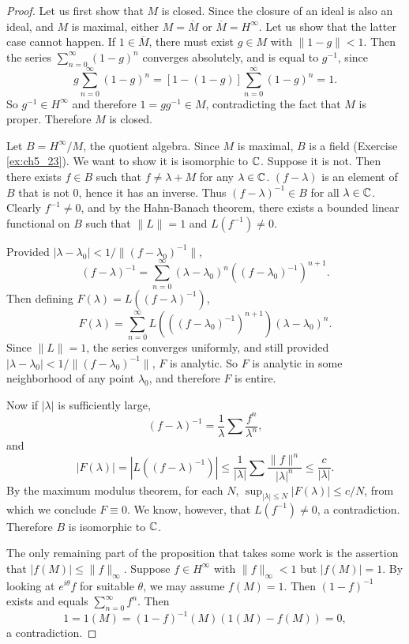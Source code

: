 \begin{proof}
Let us first show that $M$ is closed. Since the closure of an ideal is also an ideal, and $M$ is maximal, either $M = \overline{M}$ or $\overline{M} = H^\infty$. Let us show that the latter case cannot happen. If $1 \in \overline{M}$, there must exist $g \in M$ with $\|1 - g\| < 1$. Then the series $\sum_{n=0}^\infty(1-g)^n$ converges absolutely, and is equal to $g^{-1}$, since
\[
    g\sum_{n=0}^\infty(1-g)^n = [1-(1-g)]\sum_{n=0}^\infty(1-g)^n = 1.
\]
So $g^{-1} \in H^\infty$ and therefore $1 = gg^{-1} \in M$, contradicting the fact that $M$ is proper. Therefore $M$ is closed.

Let $B = H^\infty/M$, the quotient algebra. Since $M$ is maximal, $B$ is a field (Exercise \ref{ex:ch5_23}). We want to show it is isomorphic to $\mathbb{C}$. Suppose it is not. Then there exists $f \in B$ such that $f \neq \lambda + M$ for any $\lambda \in \mathbb{C}$. $(f - \lambda)$ is an element of $B$ that is not $0$, hence it has an inverse. Thus $(f - \lambda)^{-1} \in B$ for all $\lambda \in \mathbb{C}$. Clearly $f^{-1} \neq 0$, and by the Hahn-Banach theorem, there exists a bounded linear functional on $B$ such that $\|L\| = 1$ and $L(f^{-1}) \neq 0$.

Provided $|\lambda - \lambda_0| < 1/\|(f - \lambda_0)^{-1}\|$,
\[
    (f - \lambda)^{-1} = \sum_{n=0}^\infty(\lambda - \lambda_0)^n((f - \lambda_0)^{-1})^{n+1}.
\]
Then defining $F(\lambda) = L((f - \lambda)^{-1})$,
\[
    F(\lambda) = \sum_{n=0}^\infty L(((f - \lambda_0)^{-1})^{n+1})(\lambda - \lambda_0)^n.
\]
Since $\|L\| = 1$, the series converges uniformly, and still provided $|\lambda - \lambda_0| < 1/\|(f - \lambda_0)^{-1}\|$, $F$ is analytic. So $F$ is analytic in some neighborhood of any point $\lambda_0$, and therefore $F$ is entire.

Now if $|\lambda|$ is sufficiently large,
\[
    (f - \lambda)^{-1} = \frac{1}{\lambda}\sum \frac{f^n}{\lambda^n},
\]
and
\[
    |F(\lambda)| = |L((f - \lambda)^{-1})| \leq \frac{1}{|\lambda|}\sum \frac{\|f\|^n}{|\lambda|^n} \leq \frac{c}{|\lambda|}.
\]
By the maximum modulus theorem, for each $N$, $\sup_{|\lambda| \leq N} |F(\lambda)| \leq c/N$, from which we conclude $F \equiv 0$. We know, however, that $L(f^{-1}) \neq 0$, a contradiction. Therefore $B$ is isomorphic to $\mathbb{C}$.

The only remaining part of the proposition that takes some work is the assertion that $|f(M)| \leq \|f\|_\infty$. Suppose $f \in H^\infty$ with $\|f\|_\infty < 1$ but $|f(M)| = 1$. By looking at $e^{i\theta}f$ for suitable $\theta$, we may assume $f(M) = 1$. Then $(1-f)^{-1}$ exists and equals $\sum_{n=0}^\infty f^n$. Then
\[
    1 = 1(M) = (1-f)^{-1}(M)(1(M) - f(M)) = 0,
\]
a contradiction.
\end{proof}

